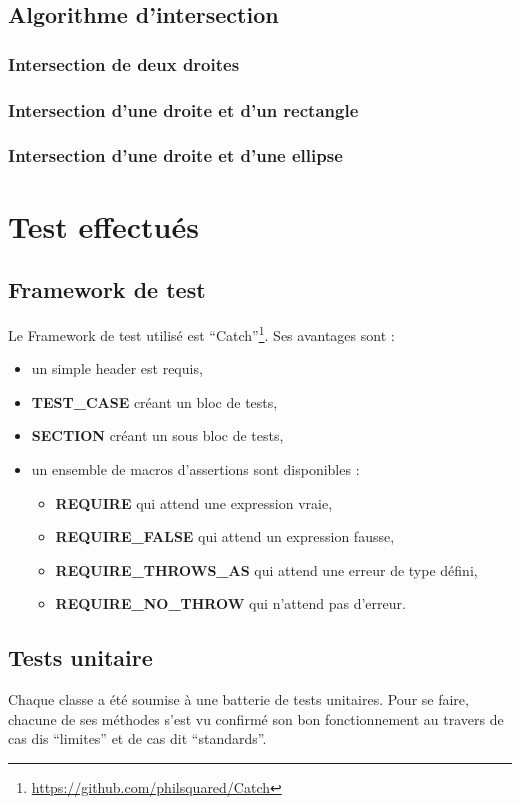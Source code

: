 \documentclass[a4paper,11pt]{report}
\begin{document}
\section[Intersection]{Algorithme d'intersection}
\subsection[Deux droites]{Intersection de deux droites}
\subsection[Droite et rectangle]{Intersection d'une droite et d'un rectangle}
\subsection[Droite et ellipse]{Intersection d'une droite et d'une ellipse}



\chapter{Test effectués}
\section{Framework de test}
Le Framework de test utilisé est
``Catch''\footnote{\url{https://github.com/philsquared/Catch}}. Ses avantages
sont :
\begin{itemize}
	\item un simple header est requis,
	\item \textbf{TEST\_CASE} créant un bloc de tests,
	\item \textbf{SECTION} créant un sous bloc de tests,
	\item un ensemble de macros d'assertions sont disponibles :
		\begin{itemize}
			\item\textbf{REQUIRE} qui attend une expression vraie,
			\item\textbf{REQUIRE\_FALSE} qui attend un expression fausse,
			\item\textbf{REQUIRE\_THROWS\_AS} qui attend une erreur de type défini,
			\item\textbf{REQUIRE\_NO\_THROW} qui n'attend pas d'erreur.
		\end{itemize}
\end{itemize} 
\section{Tests unitaire}
Chaque classe a été soumise à une batterie de tests unitaires. Pour se faire,
chacune de ses méthodes s'est vu confirmé son bon fonctionnement au travers de
cas dis ``limites'' et de cas dit ``standards''. \\
\end{document}
